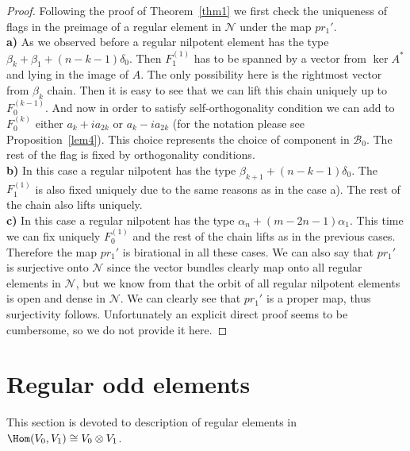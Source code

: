 \documentclass[12pt]{amsart}
\theoremstyle{definition}
\theoremstyle{remark}
\numberwithin{equation}{subsection}
\begin{document}
    \begin{proof}
    Following the proof of Theorem~\ref{thm1} we first check the uniqueness of flags in the preimage of a regular element in $\mathcal{N}$ under the map $pr_1'$.\\
    
    \textbf{a)} As we observed before a regular nilpotent element has the type $\beta_k+ \beta_1+ (n-k-1)\delta_0$. Then $F_1^{(1)}$ has to be spanned by a vector from $\ker A^*$ and lying in the image of $A$. The only possibility here is the rightmost vector from $\beta_k$ chain. Then it is easy to see that we can lift this chain uniquely up to $F_0^{(k-1)}$. And now in order to satisfy self-orthogonality condition we can add to $F_0^{(k)}$ either $a_{k}+ia_{2k}$ or $a_{k}-ia_{2k}$ (for the notation please see Proposition~\ref{lem4}). This choice represents the choice of component in $\mathcal{B}_0$. The rest of the flag is fixed by orthogonality conditions.\\
    
    \textbf{b)} In this case a regular nilpotent has the type $\beta_{k+1}+(n-k-1)\delta_0$. The $F_1^{(1)}$ is also fixed uniquely due to the same reasons as in the case a). The rest of the chain also lifts uniquely.\\
    
    \textbf{c)} In this case a regular nilpotent has the type $\alpha_n +(m-2n-1)\alpha_1$. This time we can fix uniquely $F_0^{(1)}$ and the rest of the chain lifts as in the previous cases.\\
    
    Therefore the map $pr_1'$ is birational in all these cases. We can also say that $pr_1'$ is surjective onto $\mathcal{N}$ since the vector bundles clearly map onto all regular elements in $\mathcal{N}$, but we know from \cite{GL} that the orbit of all regular nilpotent elements is open and dense in $\mathcal{N}$. We can clearly see that $pr_1'$ is a proper map, thus surjectivity follows. Unfortunately an explicit direct proof seems to be cumbersome, so we do not provide it here.
    \end{proof}
    
\section{Regular odd elements}
\label{sec3}

This section is devoted to description of regular elements in $\Hom(V_0,V_1)\cong V_0 \otimes V_1$.
\end{document}
